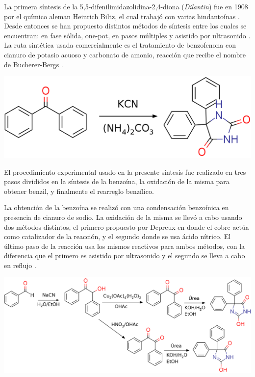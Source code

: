 \documentclass[fleqn,10pt]{SelfArx}
\begin{document}
La primera s\'intesis de la 5,5-difenilimidazolidina-2,4-diona (\textit{Dilantin}) fue en 1908 por el qu\'imico aleman Heinrich Biltz, el cual trabaj\'o con varias hindanto\'inas \cite{hayward1983}\cite{aicardi2007}. Desde entonces se han propuesto distintos m\'etodos de s\'intesis entre los cuales se encuentran: en fase s\'olida, one-pot, en pasos m\'ultiples y asistido por ultrasonido \cite{safari2010}. La ruta sint\'etica usada comercialmente es el tratamiento de benzofenona con cianuro de potasio acuoso y carbonato de amonio, reacci\'on que recibe el nombre de Bucherer-Bergs \cite{hayward1983}\cite{li2013}\cite{kadam2007}. 
\begin{scheme}[h]
	\centering
	\caption{S\'intesis comercial del Dilant\'in, reacci\'on de Bucherer-Bergs \cite{li2013}.}
	\includegraphics[width=0.8\linewidth]{structures/bucherer.png}
\end{scheme}

El procedimiento experimental usado en la presente s\'intesis fue realizado en tres pasos divididos en la s\'intesis de la benzo\'ina, la oxidaci\'on de la misma para obtener benzil, y finalmente el rearreglo benz\'ilico.

\newpage

La obtenci\'on de la benzo\'ina se realiz\'o con una condensaci\'on benzo\'inica en presencia de cianuro de sodio. La oxidaci\'on de la misma se llev\'o a cabo usando dos m\'etodos distintos, el primero propuesto por Depreux \cite{depreux1988} en donde el cobre act\'ua como catalizador de la reacci\'on, y el segundo donde se usa \'acido n\'itrico. El \'ultimo paso de la reacci\'on usa los mismos reactivos para ambos m\'etodos, con la diferencia que el primero es asistido por ultrasonido y el segundo se lleva a cabo en reflujo \cite{safari2010}.
\begin{scheme}[h]
	\centering
	\caption{S\'intesis del Dilantin con las dos rutas seguidas en el laboratorio.}
	\includegraphics[width=\linewidth]{structures/complete.png}
\end{scheme}
\end{document}

